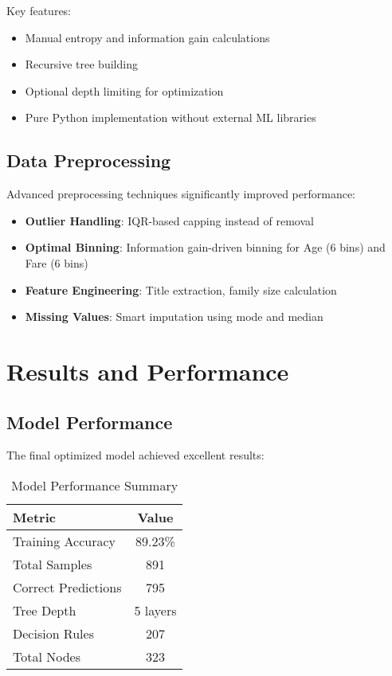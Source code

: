 \documentclass[12pt,a4paper]{article}
\begin{document}
Key features:
\begin{itemize}
    \item Manual entropy and information gain calculations
    \item Recursive tree building
    \item Optional depth limiting for optimization
    \item Pure Python implementation without external ML libraries
\end{itemize}

\subsection{Data Preprocessing}
Advanced preprocessing techniques significantly improved performance:

\begin{itemize}
    \item \textbf{Outlier Handling}: IQR-based capping instead of removal
    \item \textbf{Optimal Binning}: Information gain-driven binning for Age (6 bins) and Fare (6 bins)
    \item \textbf{Feature Engineering}: Title extraction, family size calculation
    \item \textbf{Missing Values}: Smart imputation using mode and median
\end{itemize}

\section{Results and Performance}

\subsection{Model Performance}
The final optimized model achieved excellent results:

\begin{table}[!htbp]
\centering
\begin{tabular}{|l|c|}
\hline
\textbf{Metric} & \textbf{Value} \\
\hline
Training Accuracy & 89.23\% \\
Total Samples & 891 \\
Correct Predictions & 795 \\
Tree Depth & 5 layers \\
Decision Rules & 207 \\
Total Nodes & 323 \\
\hline
\end{tabular}
\caption{Model Performance Summary}
\end{table}
\end{document}
